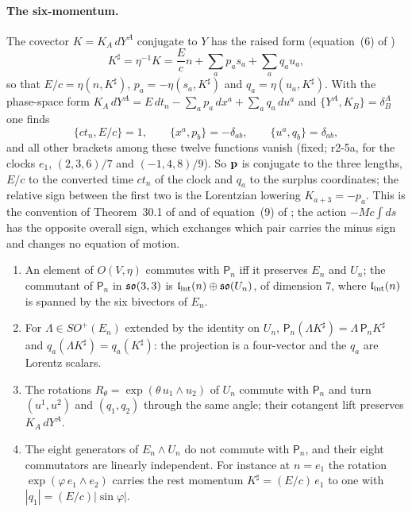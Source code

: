 \paragraph{The six-momentum.} The covector $K=K_A\,dY^A$ conjugate to $Y$ has the raised form (equation~(6) of \cite{FMB})
\begin{equation}
\label{r2:eq:K}
K^\sharp=\eta^{-1}K=\frac Ecn+\sum_ap_as_a+\sum_aq_au_a,
\end{equation}
so that $E/c=\eta(n,K^\sharp)$, $p_a=-\eta(s_a,K^\sharp)$ and $q_a=\eta(u_a,K^\sharp)$.
With the phase-space form $K_A\,dY^A=E\,dt_n-\sum_ap_a\,dx^a+\sum_aq_a\,du^a$ and $\{Y^A,K_B\}=\delta^A_B$ one finds
\[
\{ct_n,E/c\}=1,\qquad \{x^a,p_b\}=-\delta_{ab},\qquad \{u^a,q_b\}=\delta_{ab},
\]
and all other brackets among these twelve functions vanish (fixed; r2-5a, for the clocks $e_1$, $(2,3,6)/7$ and $(-1,4,8)/9$). So $\mathbf p$ is conjugate to the three lengths, $E/c$
to the converted time $ct_n$ of the clock and $q_a$ to the surplus coordinates; the relative sign between the first two is the Lorentzian lowering
$K_{a+3}=-p_a$. This is the convention of Theorem~30.1 of \cite{ES17} and of equation~(9) of \cite{FMB}; the action $-Mc\int ds$ has the opposite overall
sign, which exchanges which pair carries the minus sign and changes no equation of motion.

\begin{proposition}
\label{r2:prop:cov}
\begin{enumerate}[label=(\roman*),leftmargin=2.2em]
\item An element of $O(V,\eta)$ commutes with $\mathsf P_n$ iff it preserves $E_n$ and $U_n$; the commutant of $\mathsf P_n$ in $\mathfrak{so}(3,3)$ is
$\mathfrak l_{\rm int}(n)\oplus\mathfrak{so}(U_n)$, of dimension $7$, where $\mathfrak l_{\rm int}(n)$ is spanned by the six bivectors of $E_n$.
\item For $\Lambda\in SO^+(E_n)$ extended by the identity on $U_n$, $\mathsf P_n(\Lambda K^\sharp)=\Lambda\,\mathsf P_nK^\sharp$ and
$q_a(\Lambda K^\sharp)=q_a(K^\sharp)$: the projection is a four-vector and the $q_a$ are Lorentz scalars.
\item The rotations $R_\theta=\exp(\theta\,u_1\wedge u_2)$ of $U_n$ commute with $\mathsf P_n$ and turn $(u^1,u^2)$ and $(q_1,q_2)$ through the same
angle; their cotangent lift preserves $K_A\,dY^A$.
\item The eight generators of $E_n\wedge U_n$ do not commute with $\mathsf P_n$, and their eight commutators are linearly independent. For instance
at $n=e_1$ the rotation $\exp(\varphi\,e_1\wedge e_2)$ carries the rest momentum $K^\sharp=(E/c)\,e_1$ to one with $|q_1|=(E/c)|\sin\varphi|$.
\end{enumerate}
\end{proposition}

